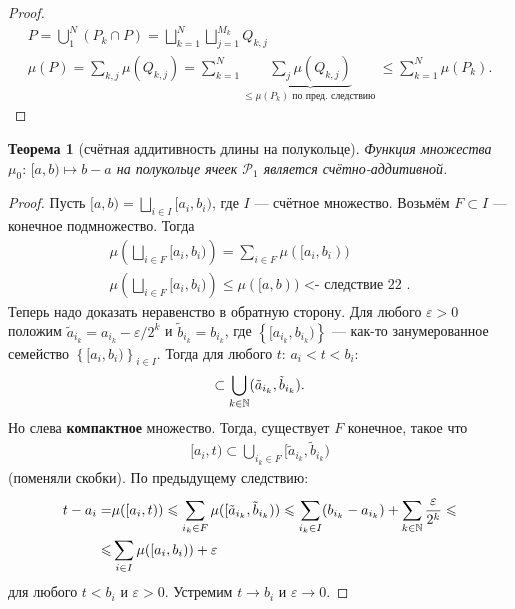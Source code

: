 \documentclass[a4paper,14pt]{extarticle}
\newcounter{theoremCnt}
\theoremstyle{definition}
\theoremstyle{plain}
\newtheorem{thm}[theoremCnt]{Теорема}
\theoremstyle{plain}
\theoremstyle{plain}
\theoremstyle{plain}
\theoremstyle{definition}
\theoremstyle{definition}
\theoremstyle{definition}
\theoremstyle{definition}
\theoremstyle{definition}
\theoremstyle{definition}
\theoremstyle{plain}
\theoremstyle{plain}
\theoremstyle{plain}
\theoremstyle{plain}
\theoremstyle{definition}
\theoremstyle{definition}
\theoremstyle{definition}
\theoremstyle{definition}
\theoremstyle{definition}
\newcommand{\N}{\ensuremath \mathbb{N}}
\begin{document}
\begin{proof}
 \begin{align*}
  P = \bigcup_1^N (P_k \cap P) = \bigsqcup_{k=1}^N \bigsqcup_{j=1}^{M_k} Q_{k,j} \\
  \mu(P) = \sum_{k,j}^{} \mu(Q_{k,j}) = \sum_{k=1}^{N} \underbrace{\sum_j \mu(Q_{k,j})}_{\leqslant \mu(P_k) \text{ по пред. следствию }} \leqslant \sum_{k=1}^{N} \mu(P_k)
 .\end{align*}
\end{proof}
\begin{thm}[счётная аддитивность длины на полукольце]
 Функция множества $ \mu_0 \colon\, [a, b) \mapsto b - a $ на полукольце ячеек $ \mathcal{P}_1 $ является счётно-аддитивной.
\end{thm}
\begin{proof}
 Пусть $ [a, b) = \bigsqcup_{i \in I} [a_i, b_i) $, где $ I $ --- счётное множество. Возьмём $ F \subset I $ --- конечное подмножество. Тогда
 \begin{align*}
  \mu\left( \bigsqcup_{i \in F} [a_i, b_i) \right) = \sum_{i \in F}^{} \mu( [a_i, b_i) ) \\
  \mu\left( \bigsqcup_{i \in F} [a_i, b_i) \right) \leqslant \mu([a, b)) \text { <- следствие 22 }
 .\end{align*} Теперь надо доказать неравенство в обратную сторону. Для любого $ \varepsilon > 0 $ положим $ \tilde a_{i_k} = a_{i_k} - \varepsilon/2^k $ и $ \tilde b_{i_k} = b_{i_k} $, где $ \left\{ [a_{i_k}, b_{i_k}) \right\}  $ --- как-то занумерованное семейство $ \left\{ [a_i, b_i) \right\}_{i \in I}  $. Тогда для любого $ t $: $ a_i < t < b_i $:
 \begin{align*}
  [a_i, t] \subset \bigcup_{k \in \N} (\tilde a_{i_k}, \tilde b_{i_k})
 .\end{align*} Но слева \textbf{компактное} множество. Тогда, существует $ F $ конечное, такое что
 \begin{align*}
  [a_i, t) \subset \bigcup_{i_k \in F} [\tilde a_{i_k}, \tilde b_{i_k})
 \end{align*} (поменяли скобки). По предыдущему следствию:
 \begin{align*}
  t - a_i = & \mu([a_i, t)) \leqslant \sum_{i_k \in F}^{} \mu([\tilde a_{i_k}, \tilde b_{i_k})) \leqslant \sum_{i_k \in I}^{} (b_{i_k} - a_{i_k}) + \sum_{k \in \N} \frac{\varepsilon}{2^k} \leqslant \\
  \leqslant & \sum_{i \in I} \mu([a_i, b_i)) + \varepsilon
 \end{align*} для любого $ t < b_i $ и $ \varepsilon > 0 $. Устремим $ t \to b_i $ и $ \varepsilon \to 0 $.
\end{proof}
\end{document}
